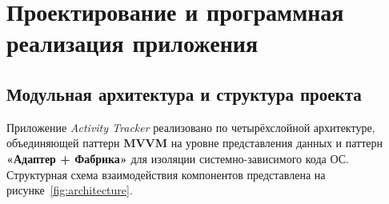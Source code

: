 \documentclass{timcw}
\begin{document}
\newpage
\chapter{Проектирование и программная реализация приложения}

\section{Модульная архитектура и структура проекта}

Приложение \emph{Activity Tracker} реализовано по четырёхслойной архитектуре, объединяющей паттерн \textbf{MVVM} на уровне представления данных и паттерн \textbf{«Адаптер + Фабрика»} для изоляции системно-зависимого кода ОС. Структурная схема взаимодействия компонентов представлена на рисунке~\ref{fig:architecture}.
\end{document}
